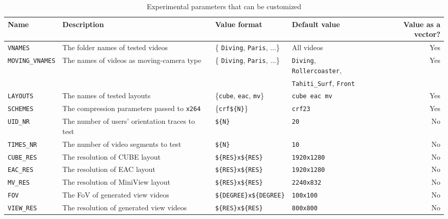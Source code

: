 \begin{table*}\centering
{}
\caption{Experimental parameters that can be customized}
\label{tab:customization}
\begin{tabular}{@{}llllr@{}} \toprule

  Name & Description & Value format & Default value & Value as a vector?\\
\midrule
    {\tt VNAMES} & The folder names of tested videos & \{ {\tt Diving}, {\tt Paris}, $\ldots$\} & All videos & Yes \\
    {\tt MOVING\_VNAMES} & The names of videos as moving-camera type & \{ {\tt Diving}, {\tt Paris}, $\ldots$\} & {\tt Diving}, {\tt Rollercoaster}, & Yes \\
     &  &  & {\tt Tahiti\_Surf}, {\tt Front} &  \\
    {\tt LAYOUTS} & The names of tested layouts & \{{\tt cube}, {\tt eac}, {\tt mv}\} & {\tt cube eac mv} & Yes\\
    {\tt SCHEMES} & The compression parameters passed to {\tt x264} & \{{\tt crf\$\{N\}}\} & {\tt crf23} & Yes\\
    {\tt UID\_NR} & The number of users' orientation traces to test & {\tt \$\{N\}} & {\tt 20} & No \\
    {\tt TIMES\_NR} & The number of video segments to test & {\tt \$\{N\}} & {\tt 10} & No \\
    {\tt CUBE\_RES} & The resolution of CUBE layout & {\tt \$\{RES\}x\$\{RES\}} & {\tt 1920x1280} & No\\
    {\tt EAC\_RES} & The resolution of EAC layout & {\tt \$\{RES\}x\$\{RES\}} & {\tt 1920x1280} & No\\
    {\tt MV\_RES} & The resolution of MiniView layout & {\tt \$\{RES\}x\$\{RES\}} & {\tt 2240x832} & No\\
    {\tt FOV} & The FoV of generated view videos & {\tt \$\{DEGREE\}x\$\{DEGREE\}} & {\tt 100x100} & No\\
    {\tt VIEW\_RES} & The resolution of generated view videos & {\tt \$\{RES\}x\$\{RES\}} & {\tt 800x800} & No\\
\bottomrule
\end{tabular}
\end{table*}

